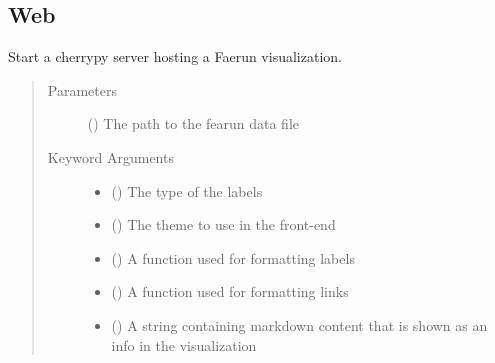 \documentclass[letterpaper,10pt,english]{sphinxmanual}
\begin{document}
\subsection{Web}
\label{\detokenize{documentation:web}}

\begin{fulllineitems}
\label{\detokenize{documentation:faerun.host}}
Start a cherrypy server hosting a Faerun visualization.
\begin{quote}\begin{description}
\item[{Parameters}] \leavevmode
{} () \textendash{} The path to the fearun data file

\item[{Keyword Arguments}] \leavevmode\begin{itemize}
\item {} 
 () \textendash{} The type of the labels

\item {} 
 () \textendash{} The theme to use in the front-end

\item {} 
 () \textendash{} A function used for formatting labels

\item {} 
 () \textendash{} A function used for formatting links

\item {} 
 () \textendash{} A string containing markdown content that is shown as an info in the visualization


\end{itemize}
\end{description}
\end{quote}
\end{fulllineitems}
\end{document}
